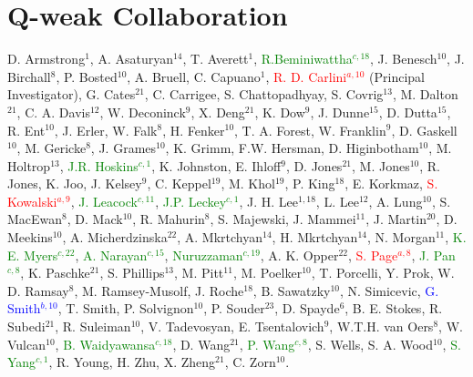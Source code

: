 \chapter{Q-weak Collaboration}
\label{Q-weak Collaboration}


\begin{singlespace}
\noindent
D. Armstrong$^{1}$, A. Asaturyan$^{14}$, T. Averett$^1$, \textcolor{green}{R.Beminiwattha$^{c,18}$}, J. Benesch$^{10}$, J. Birchall$^{8}$, P. Bosted$^{10}$, A. Bruell, C. Capuano$^{1}$, \textcolor{red}{R. D. Carlini$^{a,10}$} (Principal Investigator), G. Cates$^{21}$, C. Carrigee, S. Chattopadhyay, S. Covrig$^{13}$, M. Dalton$^{21}$, C. A. Davis$^{12}$, W. Deconinck$^{9}$, X. Deng$^{21}$, K. Dow$^{9}$, J. Dunne$^{15}$, D. Dutta$^{15}$, R. Ent$^{10}$, J. Erler, W. Falk$^{8}$, H. Fenker$^{10}$, T. A. Forest, W. Franklin$^{9}$, D. Gaskell$^{10}$, M. Gericke$^{8}$, J. Grames$^{10}$, K. Grimm, F.W. Hersman, D. Higinbotham$^{10}$, M. Holtrop$^{13}$, \textcolor{green}{J.R. Hoskins$^{c,1}$}, K. Johnston, E. Ihloff$^{9}$, D. Jones$^{21}$, M. Jones$^{10}$, R. Jones, K. Joo, J. Kelsey$^{9}$, C. Keppel$^{19}$, M. Khol$^{19}$, P. King$^{18}$, E. Korkmaz, \textcolor{red}{S. Kowalski$^{a,9}$}, \textcolor{green}{J. Leacock$^{c,11}$}, \textcolor{green}{J.P. Leckey$^{c,1}$}, J. H. Lee$^{1,18}$, L. Lee$^{12}$, A. Lung$^{10}$, S. MacEwan$^{8}$, D. Mack$^{10}$, R. Mahurin$^{8}$, S. Majewski, J. Mammei$^{11}$, J. Martin$^{20}$, D. Meekins$^{10}$, A. Micherdzinska$^{22}$, A. Mkrtchyan$^{14}$, H. Mkrtchyan$^{14}$, N. Morgan$^{11}$, \textcolor{green}{K. E. Myers$^{c,22}$}, \textcolor{green}{A. Narayan$^{c,15}$}, \textcolor{green}{Nuruzzaman$^{c,19}$}, A. K. Opper$^{22}$, \textcolor{red}{S. Page$^{a,8}$}, \textcolor{green}{J. Pan$^{c,8}$}, K. Paschke$^{21}$, S. Phillips$^{13}$, M. Pitt$^{11}$, M. Poelker$^{10}$, T. Porcelli, Y. Prok, W. D. Ramsay$^{8}$, M. Ramsey-Musolf, J. Roche$^{18}$, B. Sawatzky$^{10}$, N. Simicevic, \textcolor{blue}{G. Smith$^{b,10}$}, T. Smith, P. Solvignon$^{10}$, P. Souder$^{23}$, D. Spayde$^{6}$, B. E. Stokes, R. Subedi$^{21}$, R. Suleiman$^{10}$, V. Tadevosyan, E. Tsentalovich$^{9}$, W.T.H. van Oers$^{8}$, W. Vulcan$^{10}$, \textcolor{green}{B. Waidyawansa$^{c,18}$}, D. Wang$^{21}$, \textcolor{green}{P. Wang$^{c,8}$}, S. Wells, S. A. Wood$^{10}$, \textcolor{green}{S. Yang$^{c,1}$}, R. Young, H. Zhu, X. Zheng$^{21}$, C. Zorn$^{10}$.


\end{singlespace}
